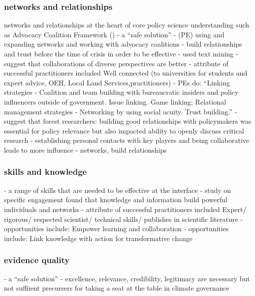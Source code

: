 \subsubsection{networks and relationships}
networks and relationships at the heart of core policy science understanding such as Advocacy Coalition Framework (\cite{Dowding2018})
\cite{CairneyO2020} - a ``safe solution''
\cite{Mintrom2019} - (PE) using and expanding networks and working with advocacy coalitions
\cite{BollykyP2024} - build relationships and trust before the time of crisis in order to be effective
\cite{ArnoldNG2016} - used text mining
\cite{BoswellS2017} - suggest that collaborations of diverse perspectives are better  
\cite{GogginEtAl2015} - attribute of successful practitioners included Well connected (to universities for students and expert advice, OEH, Local Land Services,practitioners)
\cite{vonMalmborg2024strategies} - PEs do: ``Linking strategies - Coalition and team building with bureaucratic insiders and policy influencers outside of government. Issue linking. Game linking; Relational management strategies - Networking by using social acuity. Trust building.''
\cite{OjanenBKP2021} - suggest that forest researchers: building good relationships with policymakers was essential for policy relevance but also impacted ability to openly discuss critical research
\cite{SaxonbergSL2023} - establishing personal contacts with key players and being collaborative leads to more influence
\cite{ThompsonD2024} - networks, build relationships

\subsubsection{skills and knowledge}
\cite{BednarekSHG2015,Mintrom2019} - a range of skills that are needed to be effective at the interface
\cite{Braun2009} - study on specific engagement found that knowledge and information build powerful individuals and networks
\cite{GogginEtAl2015} - attribute of successful practitioners included Expert/ rigorous/ respected scientist/ technical skills/ publishes in scientific literature
\cite{MoallemiZHSMZHKHMGLB2023} - opportunities include: Empower learning and collaboration
\cite{MoallemiZHSMZHKHMGLB2023} - opportunities include: Link knowledge with action for transformative change

\subsubsection{evidence quality}
\cite{CairneyO2020} - a ``safe solution''
\cite{IbarraJOBCIMRS2022} - excellence, relevance, credibility, legitimacy are necessary but not suffiient precursers for taking a seat at the table in climate governance

